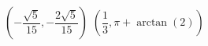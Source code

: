 { $\left(-\dfrac{\sqrt{5}}{15}, -\dfrac{2\sqrt{5}}{15}  \right)$}
{ $\left(\dfrac{1}{3}, \pi + \arctan\left(2\right) \right)$ }
